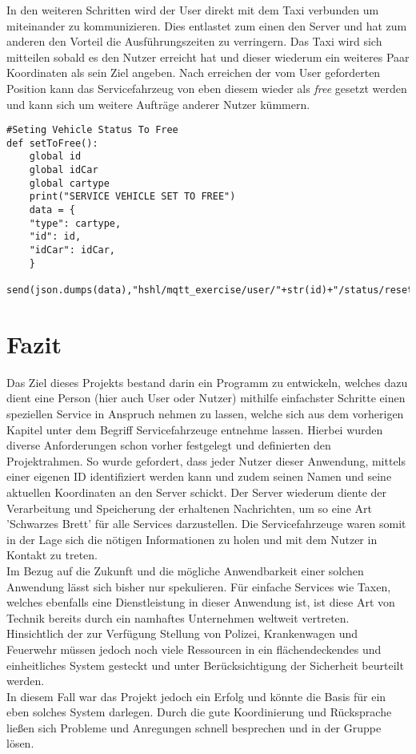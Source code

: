 \documentclass[conference]{IEEEtran}
\begin{document}
In den weiteren Schritten wird der User direkt mit dem Taxi verbunden um miteinander zu kommunizieren. Dies entlastet zum einen den Server und hat zum anderen den Vorteil die Ausführungszeiten zu verringern. Das Taxi wird sich mitteilen sobald es den Nutzer erreicht hat und dieser wiederum ein weiteres Paar Koordinaten als sein Ziel angeben. Nach erreichen der vom User geforderten Position kann das Servicefahrzeug von eben diesem wieder als \textit{free} gesetzt werden und kann sich um weitere Aufträge anderer Nutzer kümmern.

\begin{lstlisting}
#Seting Vehicle Status To Free
def setToFree():
    global id
    global idCar
    global cartype
    print("SERVICE VEHICLE SET TO FREE")
    data = {
    "type": cartype,
    "id": id,
    "idCar": idCar,
    }
    send(json.dumps(data),"hshl/mqtt_exercise/user/"+str(id)+"/status/reset")
\end{lstlisting}


\section{Fazit}\label{fazit}
Das Ziel dieses Projekts bestand darin ein Programm zu entwickeln, welches dazu dient eine Person (hier auch User oder Nutzer) mithilfe einfachster Schritte einen speziellen Service in Anspruch nehmen zu lassen, welche sich aus dem vorherigen Kapitel unter dem Begriff Servicefahrzeuge entnehme lassen. Hierbei wurden diverse Anforderungen schon vorher festgelegt und definierten den Projektrahmen. So wurde gefordert, dass jeder Nutzer dieser Anwendung, mittels einer eigenen ID identifiziert werden kann und zudem seinen Namen und seine aktuellen Koordinaten an den Server schickt. Der Server wiederum diente der Verarbeitung und Speicherung der erhaltenen Nachrichten, um so eine Art 'Schwarzes Brett' für alle Services darzustellen. Die Servicefahrzeuge waren somit in der Lage sich die nötigen Informationen zu holen und mit dem Nutzer in Kontakt zu treten.\\
Im Bezug auf die Zukunft und die mögliche Anwendbarkeit einer solchen Anwendung lässt sich bisher nur spekulieren. Für einfache Services wie Taxen, welches ebenfalls eine Dienstleistung in dieser Anwendung ist, ist diese Art von Technik bereits durch ein namhaftes Unternehmen weltweit vertreten. Hinsichtlich der zur Verfügung Stellung von Polizei, Krankenwagen und Feuerwehr müssen jedoch noch viele Ressourcen in ein flächendeckendes und einheitliches System gesteckt und unter Berücksichtigung der Sicherheit beurteilt werden.\\
In diesem Fall war das Projekt jedoch ein Erfolg und könnte die Basis für ein eben solches System darlegen. Durch die gute Koordinierung und Rücksprache ließen sich Probleme und Anregungen schnell besprechen und in der Gruppe lösen.
\end{document}
